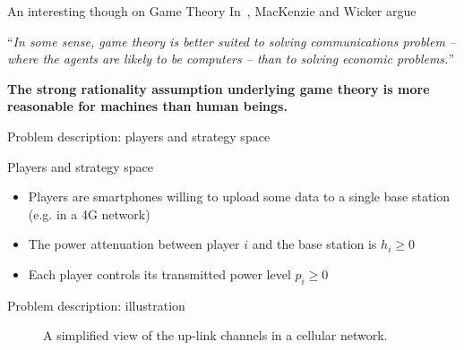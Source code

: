 \begin{frame}{An interesting though on Game Theory}
    In~\cite{mackenzie01}, MacKenzie and Wicker argue

    \begin{center}
        ``\textit{In some sense, game theory is better suited to solving communications
        problem -- where the agents are likely to be computers -- than to solving economic
        problems.}''
    \end{center}
    
    \vspace{0.5cm}
    \textbf{{\color{green}The strong rationality assumption underlying game theory is more
    reasonable for machines than human beings.}}
\end{frame}


\begin{frame}{Problem description: players and strategy space}
    \begin{exampleblock}{Players and strategy space}
        \begin{itemize}
            \pause
            \item Players are smartphones willing to upload some data to a single base station (e.g. in
            a 4G network)
            \pause
            \item The power attenuation between player $i$ and the base station is $h_i \ge 0$
            \pause
            \item Each player controls its transmitted power level $p_i \ge 0$
        \end{itemize}
    \end{exampleblock}
\end{frame}

\begin{frame}{Problem description: illustration}
    \begin{figure}
        \centering
        \caption{A simplified view of the up-link channels in a cellular network.}
    \end{figure}
\end{frame}

